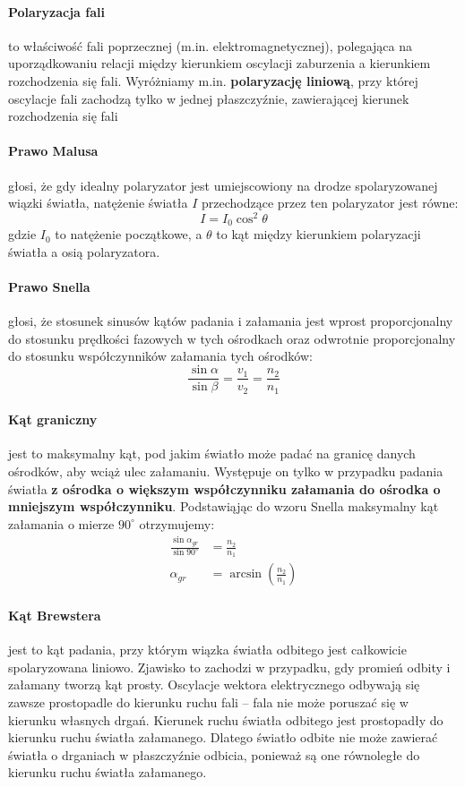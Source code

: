 \documentclass[a4paper]{article}
\begin{document}
\paragraph*{Polaryzacja fali} to właściwość fali poprzecznej (m.in. elektromagnetycznej), polegająca na uporządkowaniu relacji między kierunkiem oscylacji zaburzenia a kierunkiem rozchodzenia się fali.
Wyróżniamy m.in. \textbf{polaryzację liniową}, przy której oscylacje fali zachodzą tylko w jednej płaszczyźnie, zawierającej kierunek rozchodzenia się fali

\paragraph*{Prawo Malusa} głosi, że gdy idealny polaryzator jest umiejscowiony na drodze spolaryzowanej wiązki światła, natężenie światła $I$ przechodzące przez ten polaryzator jest równe:
\[
	I = I_0 \cos^2 \theta
\]
gdzie $I_0$ to natężenie początkowe, a $\theta$ to kąt między kierunkiem polaryzacji światła a osią polaryzatora.

\paragraph*{Prawo Snella} głosi, że stosunek sinusów kątów padania i załamania jest wprost proporcjonalny do stosunku prędkości fazowych w tych ośrodkach oraz odwrotnie proporcjonalny do stosunku współczynników załamania tych ośrodków:
\[
	\frac{\sin \alpha}{\sin \beta} = \frac{v_1}{v_2} = \frac{n_2}{n_1}
\]

\paragraph*{Kąt graniczny} jest to maksymalny kąt, pod jakim światło może padać na granicę danych ośrodków, aby wciąż ulec załamaniu. Występuje on tylko w przypadku padania światła \textbf{z ośrodka o większym współczynniku załamania do ośrodka o mniejszym współczynniku}. Podstawiąjąc do wzoru Snella maksymalny kąt załamania o mierze $90^\circ$ otrzymujemy:
\begin{align*}
	\frac{\sin \alpha_{gr}}{\sin 90^\circ} &= \frac{n_2}{n_1} \\
	\alpha_{gr} &= \arcsin \left(\frac{n_2}{n_1}\right)
\end{align*}

\paragraph*{Kąt Brewstera} jest to kąt padania, przy którym wiązka światła odbitego jest całkowicie spolaryzowana liniowo. Zjawisko to zachodzi w przypadku, gdy promień odbity i załamany tworzą kąt prosty. 
Oscylacje wektora elektrycznego odbywają się zawsze prostopadle do kierunku ruchu fali -- fala nie może poruszać się w kierunku własnych drgań.
Kierunek ruchu światła odbitego jest prostopadły do kierunku ruchu światła załamanego.
Dlatego światło odbite nie może zawierać światła o drganiach w płaszczyźnie odbicia, ponieważ są one równoległe do kierunku ruchu światła załamanego.
\end{document}
